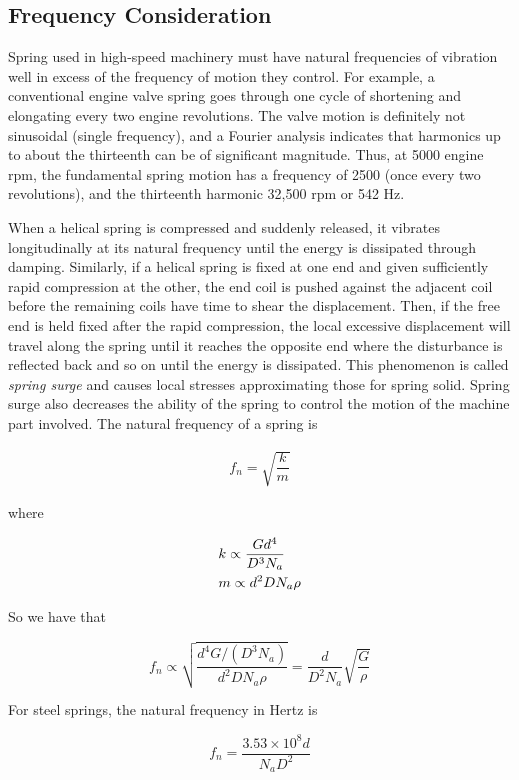 \documentclass[a4paper,openany,12pt]{book}
\begin{document}
{{\subsection{Frequency Consideration}
\label{frequency-consideration}
Spring used in high-speed machinery must have natural frequencies of
vibration well in excess of the frequency of motion they control. For
example, a conventional engine valve spring goes through one cycle of
shortening and elongating every two engine revolutions. The valve motion
is definitely not sinusoidal (single frequency), and a Fourier analysis
indicates that harmonics up to about the thirteenth can be of
significant magnitude. Thus, at 5000 engine rpm, the fundamental spring
motion has a frequency of 2500 (once every two revolutions), and the
thirteenth harmonic 32,500 rpm or 542 Hz.

When a helical spring is compressed and suddenly released, it vibrates
longitudinally at its natural frequency until the energy is dissipated
through damping. Similarly, if a helical spring is fixed at one end and
given sufficiently rapid compression at the other, the end coil is
pushed against the adjacent coil before the remaining coils have time to
shear the displacement. Then, if the free end is held fixed after the
rapid compression, the local excessive displacement will travel along
the spring until it reaches the opposite end where the disturbance is
reflected back and so on until the energy is dissipated. This phenomenon
is called \emph{spring surge} and causes local stresses approximating those
for spring solid. Spring surge also decreases the ability of the spring
to control the motion of the machine part involved. The natural
frequency of a spring is

$$\begin{gathered}
    f_n = \sqrt {\dfrac{k}{m}}
  \end{gathered}$$

where

$$\begin{gathered}
    k \propto \frac{Gd^4}{D^3N_a} \hfill \\
    m \propto d^2DN_a\rho  \hfill
\end{gathered}$$

So we have that

$$f_n \propto \sqrt {\frac{d^4G/(D^3N_a)}{d^2DN_a\rho }}  = \frac{d}{D^2N_a}\sqrt {\frac{G}{\rho }}$$

For steel springs, the natural frequency in Hertz is

$$f_n = \frac{3.53 \times 10^8d}{N_aD^2}$$

}}
\end{document}
